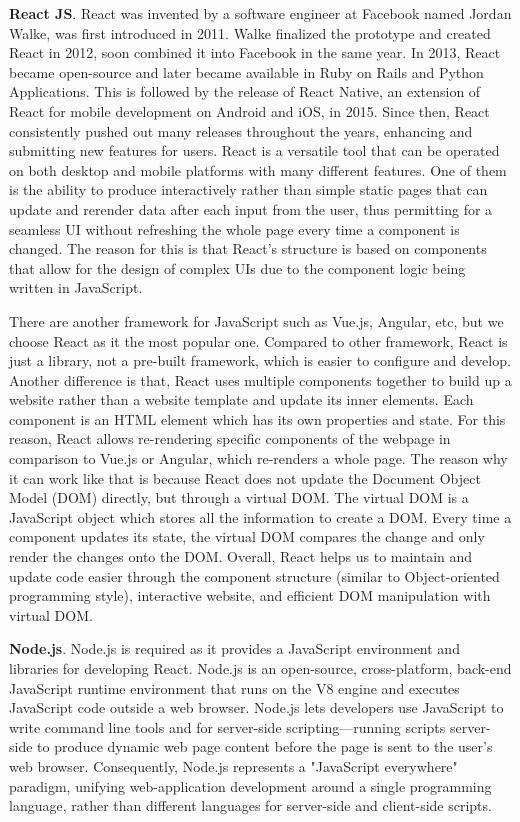\bigskip
{\textbf{React JS}}. React was invented by a software engineer at Facebook named Jordan Walke, was first introduced in 2011. Walke finalized the prototype and created React in 2012, soon combined it into Facebook in the same year. In 2013, React became open-source and later became available in Ruby on Rails and Python Applications. This is followed by the release of React Native, an extension of React for mobile development on Android and iOS, in 2015. Since then, React consistently pushed out many releases throughout the years, enhancing and submitting new features for users. React is a versatile tool that can be operated on both desktop and mobile platforms with many different features. One of them is the ability to produce interactively rather than simple static pages that can update and rerender data after each input from the user, thus permitting for a seamless UI without refreshing the whole page every time a component is changed. The reason for this is that React’s structure is based on components that allow for the design of complex UIs due to the component logic being written in JavaScript.

There are another framework for JavaScript such as Vue.js, Angular, etc, but we choose React as it the most popular one. Compared to other framework, React is just a library, not a pre-built framework, which is easier to configure and develop. Another difference is that, React uses multiple components together to build up a website rather than a website template and update its inner elements. Each component is an HTML element which has its own properties and state. For this reason, React allows re-rendering specific components of the webpage in comparison to Vue.js or Angular, which re-renders a whole page. The reason why it can work like that is because React does not update the Document Object Model (DOM) directly, but through a virtual DOM. The virtual DOM is a JavaScript object which stores all the information to create a DOM. Every time a component updates its state, the virtual DOM compares the change and only render the changes onto the DOM. Overall, React helps us to maintain and update code easier through the component structure (similar to Object-oriented programming style), interactive website, and efficient DOM manipulation with virtual DOM.

\bigskip
{\textbf{Node.js}}. Node.js is required as it provides a JavaScript environment and libraries for developing React. Node.js is an open-source, cross-platform, back-end JavaScript runtime environment that runs on the V8 engine and executes JavaScript code outside a web browser. Node.js lets developers use JavaScript to write command line tools and for server-side scripting—running scripts server-side to produce dynamic web page content before the page is sent to the user's web browser. Consequently, Node.js represents a "JavaScript everywhere" paradigm, unifying web-application development around a single programming language, rather than different languages for server-side and client-side scripts.

